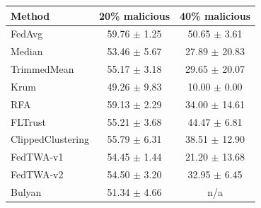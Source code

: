 \begin{tabular}{lcc}
\toprule
Method & 20\% malicious & 40\% malicious \\
\midrule
FedAvg & 59.76 $\pm$ 1.25 & 50.65 $\pm$ 3.61 \\
Median & 53.46 $\pm$ 5.67 & 27.89 $\pm$ 20.83 \\
TrimmedMean & 55.17 $\pm$ 3.18 & 29.65 $\pm$ 20.07 \\
Krum & 49.26 $\pm$ 9.83 & 10.00 $\pm$ 0.00 \\
RFA & 59.13 $\pm$ 2.29 & 34.00 $\pm$ 14.61 \\
FLTrust & 55.21 $\pm$ 3.68 & 44.47 $\pm$ 6.81 \\
ClippedClustering & 55.79 $\pm$ 6.31 & 38.51 $\pm$ 12.90 \\
FedTWA-v1 & 54.45 $\pm$ 1.44 & 21.20 $\pm$ 13.68 \\
FedTWA-v2 & 54.50 $\pm$ 3.20 & 32.95 $\pm$ 6.45 \\
Bulyan & 51.34 $\pm$ 4.66 & n/a \\
\bottomrule
\end{tabular}